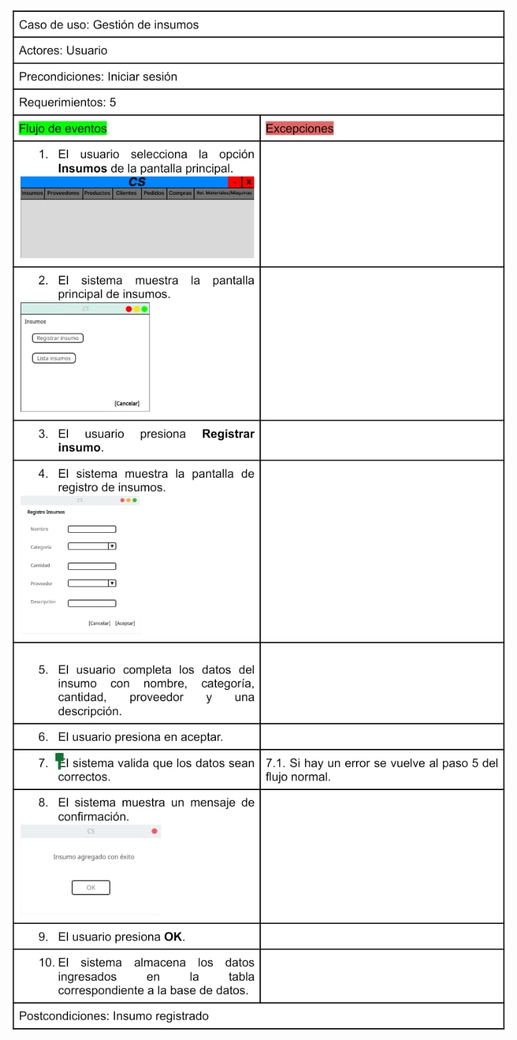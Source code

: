 \documentclass{article}
\begin{document}
    \includegraphics[width=0.9\linewidth]{imagenes/imagen_de_especificaion_muy_dificil_de_replicar_en_latex.jpg}
    
\end{document}
